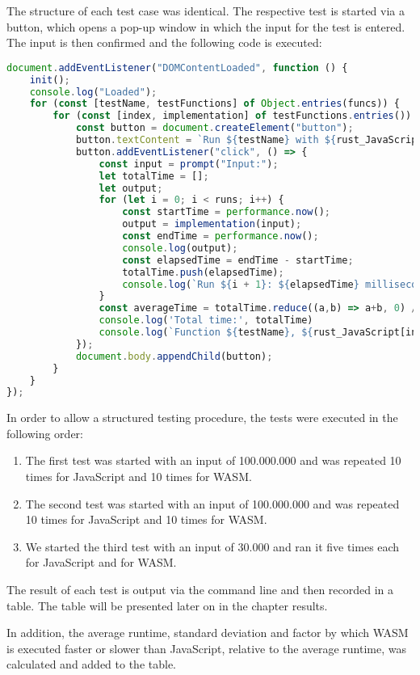 The structure of each test case was identical. The respective test is started via a button, which opens a pop-up window in which the input for the test is entered. The input is then confirmed and the following code is executed:
\begin{lstlisting}[language=JavaScript, caption={Test execution, source: self-coded}, label=lst:test_execution]
document.addEventListener("DOMContentLoaded", function () {
    init();
    console.log("Loaded");
    for (const [testName, testFunctions] of Object.entries(funcs)) {
        for (const [index, implementation] of testFunctions.entries()) {
            const button = document.createElement("button");
            button.textContent = `Run ${testName} with ${rust_JavaScript[index]}`;
            button.addEventListener("click", () => {
                const input = prompt("Input:");
                let totalTime = [];
                let output;
                for (let i = 0; i < runs; i++) {
                    const startTime = performance.now();
                    output = implementation(input);
                    const endTime = performance.now();
                    console.log(output);
                    const elapsedTime = endTime - startTime;
                    totalTime.push(elapsedTime);
                    console.log(`Run ${i + 1}: ${elapsedTime} milliseconds`);
                }
                const averageTime = totalTime.reduce((a,b) => a+b, 0) / runs;
                console.log('Total time:', totalTime)
                console.log(`Function ${testName}, ${rust_JavaScript[index]} with input ${input} took ${averageTime} miliseconds to execute`);
            });
            document.body.appendChild(button);
        }
    }
});
\end{lstlisting}

In order to allow a structured testing procedure, the tests were executed in the following order:
\begin{enumerate}
\item The first test was started with an input of 100.000.000 and was repeated 10 times for JavaScript and 10 times for WASM.
\item The second test was started with an input of 100.000.000 and was repeated 10 times for JavaScript and 10 times for WASM.
\item We started the third test with an input of 30.000 and ran it five times each for JavaScript and for WASM.
\end{enumerate}
The result of each test is output via the command line and then recorded in a table. The table will be presented later on in the chapter results.

In addition, the average runtime, standard deviation and factor by which WASM is executed faster or slower than JavaScript, relative to the average runtime, was calculated and added to the table.